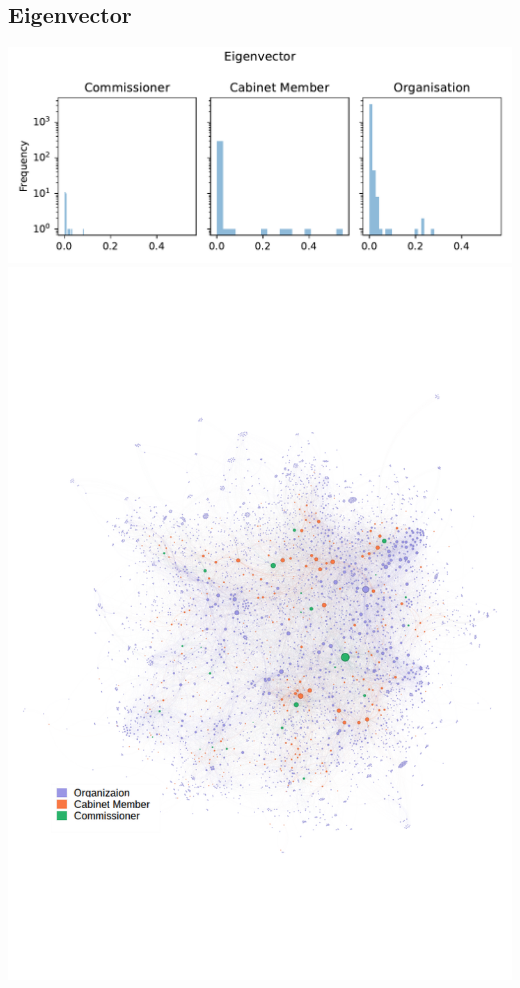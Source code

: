 \documentclass[ 11pt]{article}
\begin{document}
\subsection{Eigenvector}
\includegraphics[scale=0.6]{../Programs/Figures/Eigenvector.pdf}\\
\includegraphics[scale=0.5]{../Programs/Figures/Eigenvector.png} 
\end{document}
